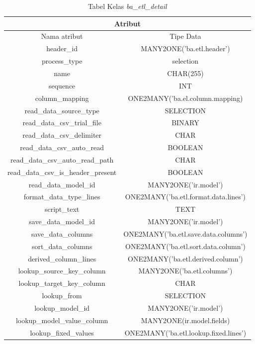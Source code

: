 \begin{table}[H]
	\centering
		\caption{Tabel Kelas \textit{ba\_etl\_detail}}
		\begin{tabular}{ | c | c|}
			\hline
				\multicolumn{2}{|c|}{Atribut}\\ \hline 
				Nama atribut & Tipe Data\\ \hline
			header\_id & MANY2ONE('ba.etl.header')\\ \hline
			process\_type & selection\\ \hline
			name & CHAR(255)\\ \hline
			sequence &  INT\\ \hline
			column\_mapping &  ONE2MANY('ba.el.column.mapping)\\ \hline
			read\_data\_source\_type & SELECTION\\ \hline
			read\_data\_csv\_trial\_file &  BINARY\\ \hline
			read\_data\_csv\_delimiter &  CHAR\\ \hline
			read\_data\_csv\_auto\_read &  BOOLEAN\\ \hline
			read\_data\_csv\_auto\_read\_path &  CHAR\\ \hline
			read\_data\_csv\_is\_header\_present &  BOOLEAN\\ \hline
			read\_data\_model\_id &  MANY2ONE('ir.model')\\ \hline
			format\_data\_type\_lines &  ONE2MANY('ba.etl.format.data.lines')\\ \hline
			script\_text &  TEXT\\ \hline
			save\_data\_model\_id &  MANY2ONE('ir.model')\\ \hline
			save\_data\_columns & ONE2MANY('ba.etl.save.data.columns')\\ \hline
			sort\_data\_columns &  ONE2MANY('ba.etl.sort.data.column')\\ \hline
			 derived\_column\_lines &  ONE2MANY('ba.etl.derived.column')\\ \hline
			lookup\_source\_key\_column &  MANY2ONE('ba.etl.columns')\\ \hline
			lookup\_target\_key\_column &  CHAR\\ \hline
			lookup\_from &  SELECTION\\ \hline
		  lookup\_model\_id &  MANY2ONE('ir.model')\\ \hline
			lookup\_model\_value\_column &  MANY2ONE(ir.model.fields)\\ \hline
			lookup\_fixed\_values &  ONE2MANY('ba.etl.lookup.fixed.lines')\\ \hline

\end{tabular}
\end{table}
